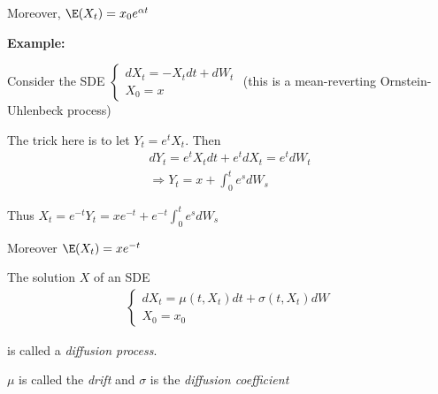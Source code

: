 \noindent Moreover, $\E(X_t) = x_0e^{\alpha t}$
\par\bigskip
\noindent\textbf{Example:}\par
\noindent Consider the SDE $\begin{cases}
  dX_t = -X_tdt + dW_t\\X_0 = x
\end{cases}$ (this is a mean-reverting Ornstein-Uhlenbeck process)\par
\noindent The trick here is to let $Y_t = e^tX_t$. Then
\begin{equation*}
  \begin{gathered}
    dY_t = e^tX_tdt + e^tdX_t = e^tdW_t\\
    \Rightarrow Y_t = x+\int_{0}^{t}e^sdW_s
  \end{gathered}
\end{equation*}\par
\noindent Thus $X_t = e^{-t}Y_t = xe^{-t} + e^{-t}\int_{0}^{t}e^sdW_s$\par
\noindent Moreover $\E(X_t) = xe^{-t}$
\par\bigskip
\begin{defo}{}
  The solution $X$ of an SDE
  \begin{equation*}
    \begin{gathered}
      \begin{cases}
        dX_t = \mu(t,X_t)dt + \sigma(t,X_t)dW\\
        X_0 = x_0
      \end{cases}
    \end{gathered}
  \end{equation*}\par
  \noindent is called a \textit{diffusion process}.\par
  \noindent $\mu$ is called the \textit{drift} and $\sigma$ is the \textit{diffusion coefficient}
\end{defo}
\par\bigskip
